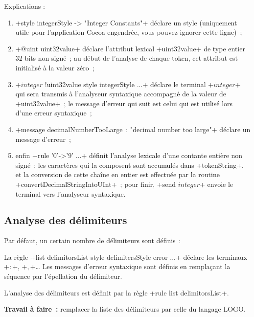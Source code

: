Explications :
\begin{enumerate}
  \item \ggs+style integerStyle -> "Integer Constants"+ déclare un style (uniquement utile pour l’application Cocoa engendrée, vous pouvez ignorer cette ligne)~;
  \item \ggs+@uint uint32value+ déclare l’attribut lexical \ggs+uint32value+ de type entier 32 bits non signé~; au début de l’analyse de chaque token, cet attribut est initialisé à la valeur zéro~;
  \item \ggs+$integer$ !uint32value style integerStyle ...+ déclare le terminal \ggs+$integer$+ qui sera transmis à l’analyseur syntaxique accompagné de la valeur de \ggs+uint32value+~;  le message d’erreur qui suit est celui qui est utilisé lors d’une erreur syntaxique~;
  \item \ggs+message decimalNumberTooLarge~: "decimal number too large"+ déclare un message d’erreur~;
  \item enfin \ggs+rule '0'->'9' ...+ définit l’analyse lexicale d’une contante entière non signé~; les caractères qui la composent sont accumulés dans \ggs+tokenString+, et la conversion de cette chaîne en entier est effectuée par la routine \ggs+convertDecimalStringIntoUInt+~; pour finir, \ggs+send $integer$+ envoie le terminal vers l’analyseur syntaxique.
\end{enumerate}

\subsection{Analyse des délimiteurs}
Par défaut, un certain nombre de délimiteurs sont définis~:


La règle \ggs+list delimitorsList style delimitersStyle error ...+ déclare les terminaux \ggs+$:$+, \ggs+$,$+… Les messages d'erreur syntaxique sont définis en remplaçant la séquence  par l’épellation du délimiteur.

L'analyse des délimiteurs est définit par la règle \ggs+rule list delimitorsList+.

\textbf{Travail à faire~:} remplacer la liste des délimiteurs par celle du langage LOGO.


